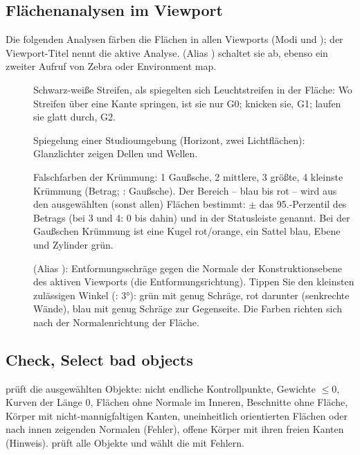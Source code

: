 \subsection{Flächenanalysen im Viewport}\label{sec:analyse-viewport}
Die folgenden Analysen färben die Flächen in allen Viewports (Modi  und
); der Viewport-Titel nennt die aktive Analyse.  (Alias
) schaltet sie ab, ebenso ein zweiter Aufruf von Zebra oder Environment map.
\begin{description}
\item[] Schwarz-weiße Streifen, als spiegelten sich Leuchtstreifen in der Fläche: Wo
  Streifen über eine Kante springen, ist sie nur G0; knicken sie, G1; laufen sie glatt durch, G2.
\item[] Spiegelung einer Studioumgebung (Horizont, zwei Lichtflächen): Glanzlichter zeigen
  Dellen und Wellen.
\item[] Falschfarben der Krümmung: 1 Gaußsche, 2 mittlere, 3 größte,
  4 kleinste Krümmung (Betrag; : Gaußsche). Der Bereich -- blau bis rot -- wird aus den
  ausgewählten (sonst allen) Flächen bestimmt: $\pm$ das 95.-Perzentil des Betrags (bei 3 und 4:
  0 bis dahin) und in der Statusleiste genannt. Bei der Gaußschen Krümmung ist eine Kugel
  rot/orange, ein Sattel blau, Ebene und Zylinder grün.
\item[] (Alias ): Entformungsschräge gegen die Normale der
  Konstruktionsebene des aktiven Viewports (die Entformungsrichtung). Tippen Sie den kleinsten
  zulässigen Winkel (: 3°): grün mit genug Schräge, rot darunter (senkrechte Wände),
  blau mit genug Schräge zur Gegenseite. Die Farben richten sich nach der Normalenrichtung der
  Fläche.
\end{description}

\subsection{Check, Select bad objects}\label{sec:cmd-check}
 prüft die ausgewählten Objekte: nicht endliche Kontrollpunkte, Gewichte $\le 0$,
Kurven der Länge 0, Flächen ohne Normale im Inneren, Beschnitte ohne Fläche, Körper mit
nicht-mannigfaltigen Kanten, uneinheitlich orientierten Flächen oder nach innen zeigenden Normalen
(Fehler), offene Körper mit ihren freien Kanten (Hinweis).  prüft alle Objekte
und wählt die mit Fehlern.

